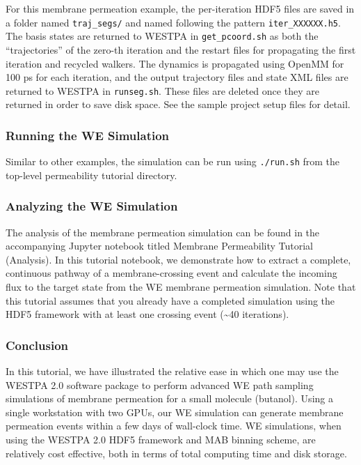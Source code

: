 For this membrane permeation example, the per-iteration HDF5 files are saved in a folder named \verb|traj_segs/| and named following the pattern \verb|iter_XXXXXX.h5|. 
The basis states are returned to WESTPA in \verb|get_pcoord.sh| as both the “trajectories” of the zero-th iteration and the restart files for propagating the first iteration and recycled walkers. 
The dynamics is propagated using OpenMM for 100 ps for each iteration, and the output trajectory files and state XML files are returned to WESTPA in \verb|runseg.sh|. 
These files are deleted once they are returned in order to save disk space. 
See the sample project setup files for detail.

\subsubsection{Running the WE Simulation}
Similar to other examples, the simulation can be run using \verb|./run.sh| from the top-level permeability tutorial directory.

\subsubsection{Analyzing the WE Simulation}
The analysis of the membrane permeation simulation can be found in the accompanying Jupyter notebook titled Membrane Permeability Tutorial (Analysis). 
In this tutorial notebook, we demonstrate how to extract a complete, continuous pathway of a membrane-crossing event and calculate the incoming flux to the target state from the WE membrane permeation simulation. 
Note that this tutorial assumes that you already have a completed simulation using the HDF5 framework with at least one crossing event (\textasciitilde40 iterations).

\subsubsection{Conclusion}
In this tutorial, we have illustrated the relative ease in which one may use the WESTPA 2.0 software package to perform advanced WE path sampling simulations of membrane permeation for a small molecule (butanol). 
Using a single workstation with two GPUs, our WE simulation can generate membrane permeation events within a few days of wall-clock time. 
WE simulations, when using the WESTPA 2.0 HDF5 framework and MAB binning scheme, are relatively cost effective, both in terms of total computing time and disk storage.